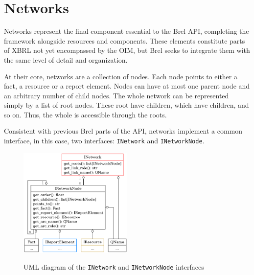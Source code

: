 \section{Networks}
\label{sec:api_networks}

Networks represent the final component essential to the Brel API, completing the framework alongside resources and components. 
These elements constitute parts of XBRL not yet encompassed by the OIM, 
but Brel seeks to integrate them with the same level of detail and organization.

At their core, networks are a collection of nodes.
Each node points to either a fact, a resource or a report element.
Nodes can have at most one parent node and an arbitrary number of child nodes.
The whole network can be represented simply by a list of root nodes.
These root have children, which have children, and so on.
Thus, the whole is accessible through the roots.

Consistent with previous Brel parts of the API, networks implement a common interface, 
in this case, two interfaces: \texttt{INetwork} and \texttt{INetworkNode}.


\begin{figure}[H]
    \centering
    \caption{UML diagram of the \texttt{INetwork} and \texttt{INetworkNode} interfaces}
    \includegraphics[width=0.5\textwidth]{images/brel_network_interfaces.png}
    \label{fig:brel_network_interfaces}
\end{figure}

